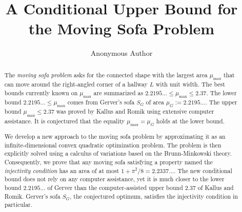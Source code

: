 \documentclass[10pt]{article}
\title{A Conditional Upper Bound for the Moving Sofa Problem}
\author{Anonymous Author}
\theoremstyle{plain}
\theoremstyle{definition}
\theoremstyle{remark}
\begin{document}
\maketitle

\begin{abstract}
The \emph{moving sofa problem} asks for the connected shape with the largest area $\mu_{\text{max}}$ that can move around the right-angled corner of a hallway $L$ with unit width. The best bounds currently known on $\mu_{\max}$ are summarized as $2.2195\ldots \leq \mu_{\max} \leq 2.37$. The lower bound $2.2195\ldots \leq \mu_{\max}$ comes from Gerver's sofa $S_G$ of area $\mu_G := 2.2195\ldots$. The upper bound $\mu_{\max} \leq 2.37$ was proved by Kallus and Romik using extensive computer assistance. It is conjectured that the equality $\mu_{\max} = \mu_G$ holds at the lower bound.

We develop a new approach to the moving sofa problem by approximating it as an infinite-dimensional convex quadratic optimization problem. The problem is then explicitly solved using a calculus of variations based on the Brunn-Minkowski theory. Consequently, we prove that any moving sofa satisfying a property named the \emph{injectivity condition} has an area of at most $1 + \pi^2/8 = 2.2337\dots$. The new conditional bound does not rely on any computer assistance, yet it is much closer to the lower bound $2.2195\ldots$ of Gerver than the computer-assisted upper bound $2.37$ of Kallus and Romik. Gerver's sofa $S_G$, the conjectured optimum, satisfies the injectivity condition in particular.
\end{abstract}

\tableofcontents




\printbibliography
\end{document}

